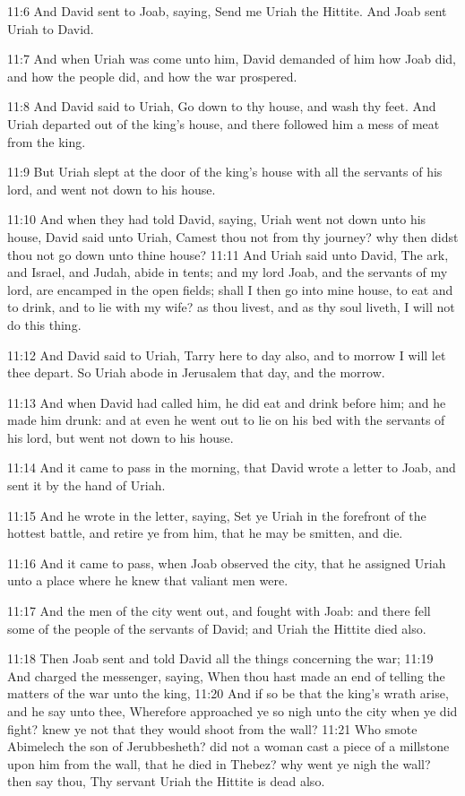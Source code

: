 11:6 And David sent to Joab, saying, Send me Uriah the Hittite. And
Joab sent Uriah to David.

11:7 And when Uriah was come unto him, David demanded of him how Joab
did, and how the people did, and how the war prospered.

11:8 And David said to Uriah, Go down to thy house, and wash thy feet.
And Uriah departed out of the king's house, and there followed him a
mess of meat from the king.

11:9 But Uriah slept at the door of the king's house with all the
servants of his lord, and went not down to his house.

11:10 And when they had told David, saying, Uriah went not down unto
his house, David said unto Uriah, Camest thou not from thy journey?
why then didst thou not go down unto thine house?  11:11 And Uriah
said unto David, The ark, and Israel, and Judah, abide in tents; and
my lord Joab, and the servants of my lord, are encamped in the open
fields; shall I then go into mine house, to eat and to drink, and to
lie with my wife? as thou livest, and as thy soul liveth, I will not
do this thing.

11:12 And David said to Uriah, Tarry here to day also, and to morrow I
will let thee depart. So Uriah abode in Jerusalem that day, and the
morrow.

11:13 And when David had called him, he did eat and drink before him;
and he made him drunk: and at even he went out to lie on his bed with
the servants of his lord, but went not down to his house.

11:14 And it came to pass in the morning, that David wrote a letter to
Joab, and sent it by the hand of Uriah.

11:15 And he wrote in the letter, saying, Set ye Uriah in the
forefront of the hottest battle, and retire ye from him, that he may
be smitten, and die.

11:16 And it came to pass, when Joab observed the city, that he
assigned Uriah unto a place where he knew that valiant men were.

11:17 And the men of the city went out, and fought with Joab: and
there fell some of the people of the servants of David; and Uriah the
Hittite died also.

11:18 Then Joab sent and told David all the things concerning the war;
11:19 And charged the messenger, saying, When thou hast made an end of
telling the matters of the war unto the king, 11:20 And if so be that
the king's wrath arise, and he say unto thee, Wherefore approached ye
so nigh unto the city when ye did fight? knew ye not that they would
shoot from the wall?  11:21 Who smote Abimelech the son of
Jerubbesheth? did not a woman cast a piece of a millstone upon him
from the wall, that he died in Thebez? why went ye nigh the wall? then
say thou, Thy servant Uriah the Hittite is dead also.


